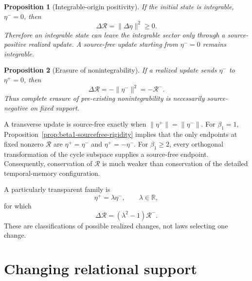 \documentclass[aip,jmp,amsmath,amssymb,reprint]{revtex4-2}
\newtheorem{proposition}{Proposition}
\newcommand{\Rcal}{\mathcal{R}}
\begin{document}
\begin{proposition}[Integrable-origin positivity]\label{prop:integrable-origin-positive}
If the initial state is integrable, $\eta^-=0$, then
\begin{equation}
\Delta\Rcal=\lVert\Delta\eta\rVert^2\ge0.
\label{eq:integrable-origin-law}
\end{equation}
Therefore an integrable state can leave the integrable sector only through a source-positive realized update. A source-free update starting from $\eta^-=0$ remains integrable.
\end{proposition}

\begin{proposition}[Erasure of nonintegrability]\label{prop:erasure}
If a realized update sends $\eta^-$ to $\eta^+=0$, then
\begin{equation}
\Delta\Rcal=-\lVert\eta^-\rVert^2=-\Rcal^-.
\label{eq:erasure-law}
\end{equation}
Thus complete erasure of pre-existing nonintegrability is necessarily source-negative on fixed support.
\end{proposition}

A transverse update is source-free exactly when $\lVert\eta^+\rVert=\lVert\eta^-\rVert$. For $\beta_1=1$, Proposition~\ref{prop:beta1-sourcefree-rigidity} implies that the only endpoints at fixed nonzero $\Rcal$ are $\eta^+=\eta^-$ and $\eta^+=-\eta^-$. For $\beta_1\ge2$, every orthogonal transformation of the cycle subspace supplies a source-free endpoint. Consequently, conservation of $\Rcal$ is much weaker than conservation of the detailed temporal-memory configuration.

A particularly transparent family is
\begin{equation}
\eta^+=\lambda\eta^-,
\qquad\lambda\in\mathbb R,
\label{eq:radial-map}
\end{equation}
for which
\begin{equation}
\Delta\Rcal=(\lambda^2-1)\Rcal^-.
\label{eq:radial-source}
\end{equation}
These are classifications of possible realized changes, not laws selecting one change.

\section{Changing relational support}\label{sec:support}
\end{document}
